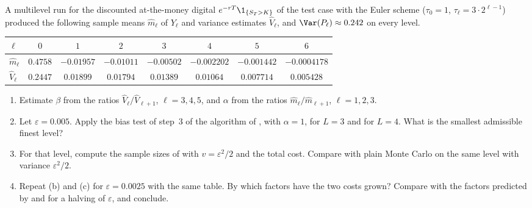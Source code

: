 \begin{exercise}\label{ex:ml-reading}
\easy A multilevel run for the discounted at-the-money digital $e^{-rT}\1_{\{S_T>K\}}$ of the test
case with the Euler scheme ($\tau_0=1$, $\tau_\ell=3\cdot2^{\ell-1}$) produced the following sample
means $\hat m_\ell$ of $Y_\ell$ and variance estimates $\hat V_\ell$, and $\Var(P_\ell)\approx0.242$
on every level.
\begin{center}
\begin{tabular}{lccccccc}
\toprule
$\ell$ & $0$ & $1$ & $2$ & $3$ & $4$ & $5$ & $6$\\
\midrule
$\hat m_\ell$ & $0.4758$ & $-0.01957$ & $-0.01011$ & $-0.00502$ & $-0.002202$ & $-0.001442$ & $-0.0004178$\\
$\hat V_\ell$ & $0.2447$ & $0.01899$ & $0.01794$ & $0.01389$ & $0.01064$ & $0.007714$ & $0.005428$\\
\bottomrule
\end{tabular}
\end{center}
\begin{enumerate}[label=(\alph*)]
  \item Estimate $\beta$ from the ratios $\hat V_\ell/\hat V_{\ell+1}$, $\ell=3,4,5$, and $\alpha$
    from the ratios $\hat m_\ell/\hat m_{\ell+1}$, $\ell=1,2,3$.
  \item Let $\varepsilon=0.005$. Apply the bias test of step~3 of the algorithm of
    , with $\alpha=1$, for $L=3$ and for $L=4$. What is the smallest
    admissible finest level?
  \item For that level, compute the sample sizes of  with $v=\varepsilon^2/2$ and
    the total cost. Compare with plain Monte Carlo on the same level with variance $\varepsilon^2/2$.
  \item Repeat (b) and (c) for $\varepsilon=0.0025$ with the same table. By which factors have the
    two costs grown? Compare with the factors predicted by  and
     for a halving of $\varepsilon$, and conclude.
\end{enumerate}
\end{exercise}

